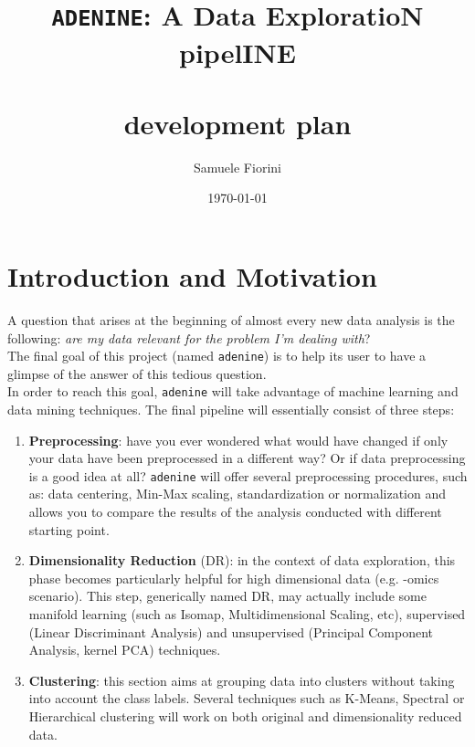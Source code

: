\documentclass[paper=a4, fontsize=10pt]{scrartcl} %
\title{	
\normalfont \normalsize
\huge{\tt ADENINE}: A Data ExploratioN pipelINE \\
\horrule{2pt} \\[0.5cm] %
development plan \\ %
}
\author{Samuele Fiorini} %
\date{\normalsize\today} %
\numberwithin{equation}{section} %
\numberwithin{figure}{section} %
\numberwithin{table}{section} %
\newcommand{\adenine}{{\tt adenine}\xspace}
\begin{document}
\maketitle %


\section{Introduction and Motivation}

A question that arises at the beginning of almost every new data analysis is
the following:  {\sl are my data relevant for the problem I'm dealing with}? \\

The final goal of this project (named \adenine) is to help its user to have a glimpse of the answer of
this tedious question. \\

In order to reach this goal, \adenine will take advantage of machine learning and
data mining techniques. The final pipeline will essentially consist of three steps:

\begin{enumerate}
	
  	\item {\bf Preprocessing}: have you ever wondered what would have 
	changed if only  your data have been preprocessed in a different way? Or if
	data preprocessing is a good idea   at all? \adenine will offer several
	preprocessing procedures, such as: data centering, Min-Max scaling,
	standardization or normalization and allows you to compare the results of the
	analysis conducted with different starting point.
	
  	\item {\bf Dimensionality Reduction} (DR): in the context of data
	exploration, this  phase becomes particularly helpful for high dimensional data (e.g.
	-omics scenario).   This step, generically named DR, may actually include some
	manifold learning   (such as Isomap, Multidimensional Scaling, etc), supervised
	(Linear   Discriminant Analysis) and unsupervised (Principal Component Analysis, 
	kernel PCA)  techniques.

	\item {\bf Clustering}: this section aims at grouping data into clusters without taking
	into account the class labels. Several techniques such as K-Means, Spectral or Hierarchical
	clustering will work on both original and dimensionality reduced data.

\end{enumerate}
\end{document}
